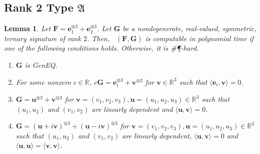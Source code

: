 \documentclass[11pt]{article}
\newtheorem{lemma}[theorem]{Lemma}
\DeclareMathOperator{\holts}{Holant^*_3}
\newcommand{\geneq}{\textsf{GenEQ}\xspace}
\newcommand{\sph}{\#\P-hard\xspace}
\newcommand{\teh}{^{\otimes 3}}
\newcommand{\ternarytractgeneq}{$\mathfrak{A}$\xspace}
\begin{document}
\subsection{Rank 2 Type \texorpdfstring{\ternarytractgeneq}{A}}
\begin{lemma}\label{lem:dichotomy-ternary-ternary-rank-2-geneq}
  Let $\mathbf{F} = \mathbf{e}_1\teh + \mathbf{e}_2\teh$.
  Let $\mathbf{G}$ be a nondegenerate, real-valued, symmetric, ternary signature of rank $2$.
  Then, $\holts(\mathbf{F}, \mathbf{G})$ is computable in polynomial time if one of the following conditions holds. Otherwise, it is \sph.
  \begin{enumerate}
    \item $\mathbf{G}$ is \geneq.
    \item For some nonzero $c \in \mathbb{R}$, $c \mathbf{G} = \mathbf{e}_i\teh + \mathbf{v} \teh$ for $\mathbf{v} \in \mathbb{R}^3$ such that $\langle \mathbf{e}_i, \mathbf{v} \rangle = 0$.
    \item $\mathbf{G} = \mathbf{u}\teh + \mathbf{v}\teh$ for $\mathbf{v} = (v_1, v_2, v_3), \mathbf{u} = (u_1, u_2, u_3) \in \mathbb{R}^3$ such that $(u_1, u_2)$ and $(v_1, v_2)$ are linearly dependent and $\langle \mathbf{u}, \mathbf{v} \rangle = 0$.
    \item $\mathbf{G} = (\mathbf{u} + i \mathbf{v})\teh + (\mathbf{u} - i \mathbf{v})\teh$ for $\mathbf{v} = (v_1, v_2, v_3), \mathbf{u} = (u_1, u_2, u_3) \in \mathbb{R}^3$ such that $(u_1, u_2)$ and $(v_1, v_2)$ are linearly dependent, $\langle \mathbf{u}, \mathbf{v} \rangle = 0$ and $\langle \mathbf{u}, \mathbf{u} \rangle = \langle \mathbf{v}, \mathbf{v} \rangle$.
  \end{enumerate}
\end{lemma}
\end{document}
